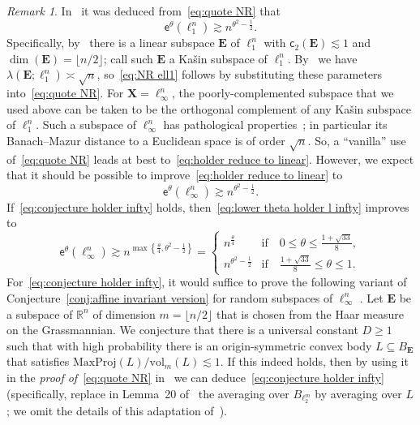 \documentclass[11pt,reqno]{amsart}
\renewcommand{\le}{\leqslant}
\renewcommand{\ge}{\geqslant}
\newcommand{\cc}{\mathsf{c}}
\newcommand{\X}{\mathbf X}
\newcommand{\R}{\mathbb R}
\theoremstyle{remark}
\newtheorem{remark}[theorem]{Remark}
\renewcommand{\subset}{\subseteq}
\newcommand{\ee}{\mathsf{e}}
\newcommand{\vol}{\mathrm{vol}}
\renewcommand{\1}{\mathbf 1}
\newcommand{\bfE}{\mathbf{E}}
\begin{document}
\begin{remark} In~\cite{NR17} it was deduced from~\eqref{eq:quote NR} that
\begin{equation}\label{eq:NR ell1}
\ee^\theta(\ell_1^n)\gtrsim n^{\theta^2-\frac12}.
\end{equation}
Specifically, by~\cite{Kas77} there is a linear subspace $\bfE$ of $\ell_1^n$ with $\cc_2(\bfE)\lesssim 1$ and $\dim(\bfE)=\lfloor n/2\rfloor$;  call such $\bfE$ a Ka\v{s}in subspace of $\ell_1^n$. By~\cite{Rut65} we have $\lambda(\bfE;\ell_1^n)\asymp \sqrt{n}$, so~\eqref{eq:NR ell1} follows by substituting these parameters into~\eqref{eq:quote NR}. For $\X=\ell_\infty^n$, the  poorly-complemented subspace  that we used above can be taken to be the orthogonal complement of any Ka\v{s}in subspace of $\ell_1^n$. Such a subspace of $\ell_\infty^n$ has pathological properties~\cite{FJ80}; in particular its Banach--Mazur distance to a Euclidean space is of order $\sqrt{n}$. So, a ``vanilla'' use of~\eqref{eq:quote NR} leads at best to~\eqref{eq:holder reduce to linear}. However, we  expect that it should be possible to improve~\eqref{eq:holder reduce to linear} to
\begin{equation}\label{eq:conjecture holder infty}
\ee^\theta(\ell_\infty^n)\gtrsim n^{\theta^2-\frac12}.
\end{equation}
If~\eqref{eq:conjecture holder infty} holds,  then~\eqref{eq:lower theta holder l infty} improves to
\begin{equation}\label{eq:lower theta holder l infty'}
\ee^\theta(\ell_\infty^n)\gtrsim n^{\max\left\{\frac{\theta}{4},\theta^2-\frac12\right\}}=\left\{\begin{array}{ll}n^{\frac{\theta}{4}}&\mathrm{if}\quad 0\le \theta\le \frac{1+\sqrt{33}}{8},\\
n^{\theta^2-\frac12}&\mathrm{if}\quad  \frac{1+\sqrt{33}}{8}\le \theta\le 1.\end{array}\right.
\end{equation}
For~\eqref{eq:conjecture holder infty}, it would suffice to prove the following variant of Conjecture~\ref{conj:affine invariant version}   for random subspaces of $\ell_\infty^n$ . Let $\bfE$ be a  subspace of $\R^n$ of dimension $m=\lfloor n/2\rfloor$ that is chosen from the Haar measure on the Grassmannian. We conjecture that there is a universal constant $D\ge 1$ such that with high probability there is an origin-symmetric convex body $L\subset B_\bfE$ that satisfies $\mathrm{MaxProj}(L)/\vol_m(L)\lesssim 1$. If this indeed holds, then by using it in the {\em proof of}~\eqref{eq:quote NR} in~\cite{NR17} we can deduce~\eqref{eq:conjecture holder infty} (specifically, replace in Lemma~20 of~\cite{NR17} the averaging over $B_{\ell_2^m}$ by averaging over $L$; we omit the details of this adaptation of~\cite{NR17}).
\end{remark}
\end{document}
